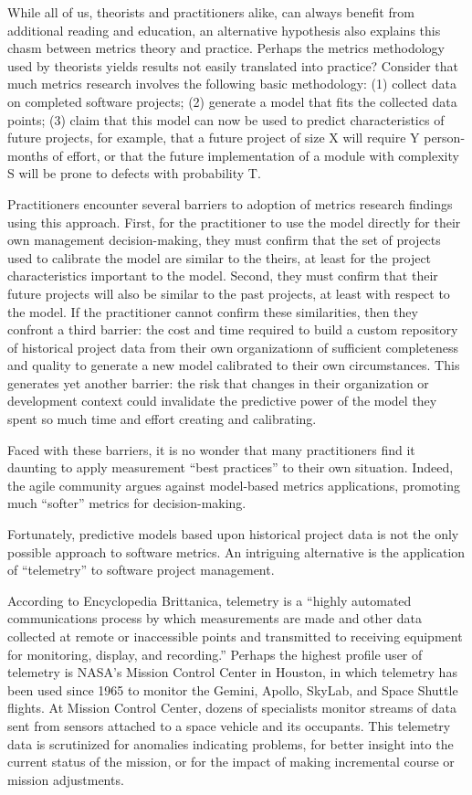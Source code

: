 \documentclass[11pt,twocolumn]{article}
\begin{document}
While all of us, theorists and practitioners alike, can always benefit from
additional reading and education, an alternative hypothesis also explains
this chasm between metrics theory and practice. Perhaps the metrics
methodology used by theorists yields results not easily translated into
practice?  Consider that much metrics research involves the following basic
methodology: (1) collect data on completed software projects; (2) generate
a model that fits the collected data points; (3) claim that this model can
now be used to predict characteristics of future projects, for example,
that a future project of size X will require Y person-months of effort, or
that the future implementation of a module with complexity S will be prone
to defects with probability T.

Practitioners encounter several barriers to adoption of metrics research
findings using this approach. First, for the practitioner to use the
model directly for their own management decision-making, they must confirm
that the set of projects used to calibrate the model are similar to the
theirs, at least for the project characteristics important to the model.
Second, they must confirm that their future projects will also be similar
to the past projects, at least with respect to the model.  If the
practitioner cannot confirm these similarities, then they confront a third
barrier: the cost and time required to build a custom repository of
historical project data from their own organizationn of sufficient
completeness and quality to generate a new model calibrated to their own
circumstances. This generates yet another barrier: the risk that changes in
their organization or development context could invalidate the predictive
power of the model they spent so much time and effort creating and
calibrating.

Faced with these barriers, it is no wonder that many practitioners find it
daunting to apply measurement ``best practices'' to their own
situation. Indeed, the agile community argues against model-based metrics
applications, promoting much ``softer'' metrics for decision-making.

Fortunately, predictive models based upon historical project data is not
the only possible approach to software metrics.  
An intriguing alternative
is the application of ``telemetry'' to software project management.



According to Encyclopedia Brittanica, telemetry is a ``highly automated
communications process by which measurements are made and other data
collected at remote or inaccessible points and transmitted to receiving
equipment for monitoring, display, and recording.''  Perhaps the highest
profile user of telemetry is NASA's Mission Control Center in Houston, in
which telemetry has been used since 1965 to monitor the Gemini, Apollo,
SkyLab, and Space Shuttle flights.  At Mission Control Center, dozens of
specialists monitor streams of data sent from sensors attached to a space
vehicle and its occupants.  This telemetry data is scrutinized for
anomalies indicating problems, for better insight into the current status
of the mission, or for the impact of making incremental course or mission
adjustments.
\end{document}
